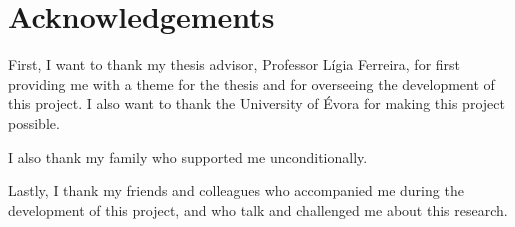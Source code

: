 \chapter*{Acknowledgements}

First, I want to thank my thesis advisor, Professor Lígia Ferreira, for first
providing me with a theme for the thesis and for overseeing the development of
this project. I also want to thank the University of Évora for making this
project possible.

I also thank my family who supported me unconditionally.

Lastly, I thank my friends and colleagues who accompanied me during the
development of this project, and who talk and challenged me about this
research.

